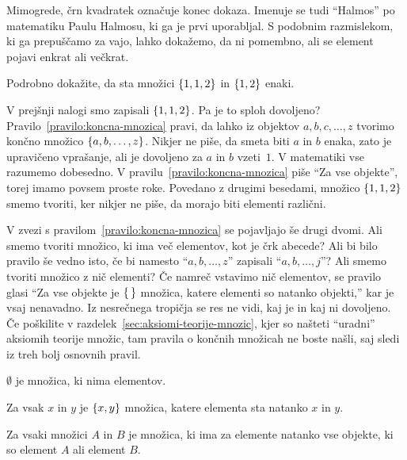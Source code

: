 Mimogrede, črn kvadratek označuje konec dokaza. Imenuje se tudi ``Halmos'' po matematiku
Paulu Halmosu, ki ga je prvi uporabljal. S podobnim razmislekom, ki ga prepuščamo za vajo,
lahko dokažemo, da ni pomembno, ali se element pojavi enkrat ali večkrat.

\begin{naloga}
  Podrobno dokažite, da sta množici $\set{1, 1, 2}$ in $\set{1, 2}$ enaki.
\end{naloga}

V prejšnji nalogi smo zapisali $\set{1, 1, 2}$. Pa je to sploh dovoljeno?
Pravilo~\ref{pravilo:koncna-mnozica} pravi, da lahko iz objektov $a, b, c, \ldots, z$
tvorimo končno množico $\set{a, b, \ldots, z}$. Nikjer ne piše, da smeta biti $a$ in $b$
enaka, zato je upravičeno vprašanje, ali je dovoljeno za $a$ in $b$ vzeti~$1$. V
matematiki vse razumemo dobesedno. V pravilu~\ref{pravilo:koncna-mnozica} piše ``Za vse
objekte'', torej imamo povsem proste roke. Povedano z drugimi besedami, množico
$\set{1, 1, 2}$ smemo tvoriti, ker nikjer ne piše, da morajo biti elementi različni.

V zvezi s pravilom~\ref{pravilo:koncna-mnozica} se pojavljajo še drugi dvomi. Ali smemo
tvoriti množico, ki ima več elementov, kot je črk abecede? Ali bi bilo pravilo še vedno
isto, če bi namesto ``$a, b, \ldots, z$'' zapisali ``$a, b, \ldots, j$''? Ali smemo
tvoriti množico z nič elementi? Če namreč vstavimo nič elementov, se pravilo glasi ``Za
vse objekte je $\set{\,}$ množica, katere elementi so natanko objekti,'' kar je vsaj
nenavadno. Iz nesrečnega tropičja se res ne vidi, kaj je in kaj ni dovoljeno. Če poškilite
v razdelek~\ref{sec:aksiomi-teorije-mnozic}, kjer so našteti ``uradni'' aksiomih teorije
množic, tam pravila o končnih množicah ne boste našli, saj sledi iz treh bolj osnovnih
pravil.

\begin{pravilo}
  \label{pravilo:prazna-mnozica}
   $\emptyset$ je množica, ki nima elementov.
\end{pravilo}

\begin{pravilo}
  \label{pravilo:neurejeni-dvojec}
  Za vsak $x$ in $y$ je  $\set{x, y}$ množica, katere elementa sta
  natanko $x$ in $y$.
\end{pravilo}

\begin{pravilo}
  \label{pravilo:unija}
  Za vsaki množici $A$ in $B$ je  množica, ki ima za elemente
  natanko vse objekte, ki so element $A$ ali element $B$.
\end{pravilo}

